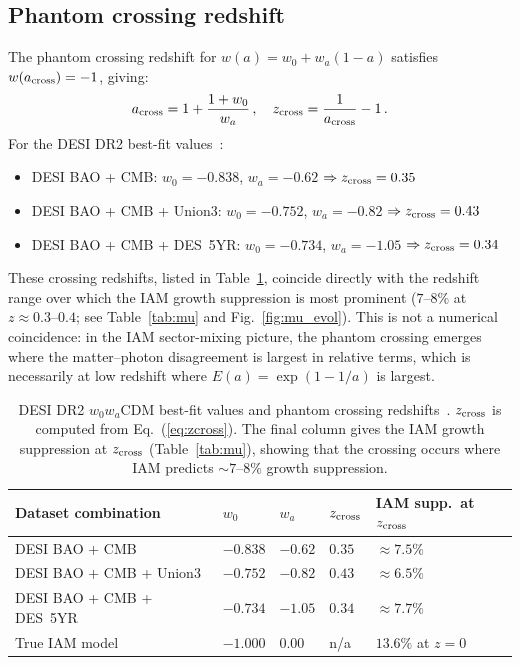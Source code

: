 \documentclass[12pt,a4paper]{article}
\begin{document}
\subsection{Phantom crossing redshift}
\label{sec:zcross}

The phantom crossing redshift for $w(a) = w_0 + w_a(1-a)$ satisfies
$w(a_{\rm cross}) = -1$, giving:
\begin{equation}
a_{\rm cross} = 1 + \frac{1+w_0}{w_a} \,,
\quad
z_{\rm cross} = \frac{1}{a_{\rm cross}} - 1 \,.
\label{eq:zcross}
\end{equation}
For the DESI DR2 best-fit values~\citep{DESI2025DR2BAO}:

\begin{itemize}
\item DESI BAO + CMB: $w_0 = -0.838$, $w_a = -0.62$
  $\Rightarrow z_{\rm cross} = 0.35$
\item DESI BAO + CMB + Union3: $w_0 = -0.752$, $w_a = -0.82$
  $\Rightarrow z_{\rm cross} = 0.43$
\item DESI BAO + CMB + DES~5YR: $w_0 = -0.734$, $w_a = -1.05$
  $\Rightarrow z_{\rm cross} = 0.34$
\end{itemize}

These crossing redshifts, listed in Table~\ref{tab:phantom}, coincide
directly with the redshift range over which the IAM growth suppression
is most prominent ($7$--$8\%$ at $z \approx 0.3$--$0.4$; see
Table~\ref{tab:mu} and Fig.~\ref{fig:mu_evol}).
This is not a numerical coincidence: in the IAM sector-mixing picture,
the phantom crossing emerges where the matter--photon disagreement is
largest in relative terms, which is necessarily at low redshift where
$E(a) = \exp(1-1/a)$ is largest.

\begin{table}[ht]
\centering
\caption{DESI DR2 $w_0 w_a$CDM best-fit values and phantom crossing
redshifts~\citep{DESI2025DR2BAO}.
$z_{\rm cross}$ is computed from Eq.~(\ref{eq:zcross}).
The final column gives the IAM growth suppression at $z_{\rm cross}$
(Table~\ref{tab:mu}), showing that the crossing occurs where IAM
predicts $\sim 7$--$8\%$ growth suppression.}
\label{tab:phantom}
\begin{tabular}{lllll}
\toprule
Dataset combination & $w_0$ & $w_a$ & $z_{\rm cross}$ & IAM supp.\ at $z_{\rm cross}$ \\
\midrule
DESI BAO + CMB             & $-0.838$ & $-0.62$ & $0.35$ & $\approx 7.5\%$ \\
DESI BAO + CMB + Union3    & $-0.752$ & $-0.82$ & $0.43$ & $\approx 6.5\%$ \\
DESI BAO + CMB + DES~5YR   & $-0.734$ & $-1.05$ & $0.34$ & $\approx 7.7\%$ \\
\midrule
True IAM model             & $-1.000$ & $0.00$  & n/a    & $13.6\%$ at $z=0$ \\
\bottomrule
\end{tabular}
\end{table}
\end{document}
